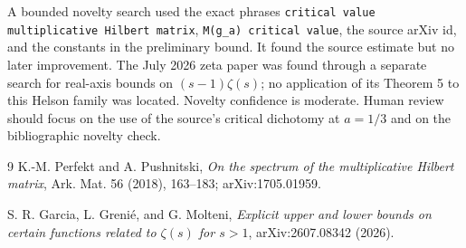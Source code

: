\documentclass[11pt]{article}
\begin{document}
A bounded novelty search used the exact phrases \texttt{critical value
multiplicative Hilbert matrix}, \texttt{M(g\_a) critical value}, the source
arXiv id, and the constants in the preliminary bound.  It found the source
estimate but no later improvement.  The July 2026 zeta paper was found through
a separate search for real-axis bounds on $(s-1)\zeta(s)$; no application of
its Theorem 5 to this Helson family was located.  Novelty confidence is
moderate.  Human review should focus on the use of the source's critical
dichotomy at $a=1/3$ and on the bibliographic novelty check.

\begin{thebibliography}{9}
K.-M. Perfekt and A. Pushnitski,
\emph{On the spectrum of the multiplicative Hilbert matrix},
Ark. Mat. 56 (2018), 163--183; arXiv:1705.01959.

S. R. Garcia, L. Greni\'e, and G. Molteni,
\emph{Explicit upper and lower bounds on certain functions related to
$\zeta(s)$ for $s>1$}, arXiv:2607.08342 (2026).
\end{thebibliography}
\end{document}
